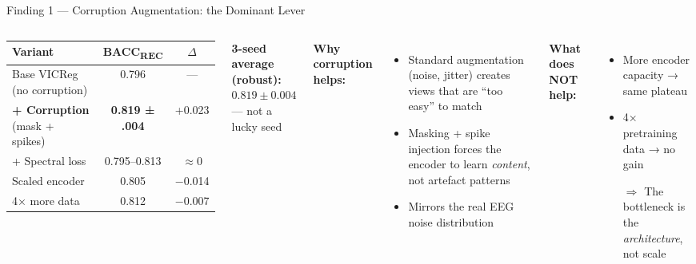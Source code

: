 \documentclass[aspectratio=169,10pt]{beamer}
\begin{document}
\begin{frame}{Finding 1 — Corruption Augmentation: the Dominant Lever}
\begin{columns}[T]
\begin{tabular}{lcc}
\toprule
Variant & BACC\textsubscript{REC} & $\Delta$ \\
\midrule
Base VICReg (no corruption) & 0.796 & — \\
\textbf{+ Corruption} (mask + spikes) & \textbf{0.819 ± .004} & \textcolor{good}{+0.023} \\
+ Spectral loss & 0.795--0.813 & $\approx$0 \\
Scaled encoder & 0.805 & $-$0.014 \\
4× more data & 0.812 & $-$0.007 \\
\bottomrule
\end{tabular}

\vspace{0.7em}
\textbf{3-seed average (robust):}\\
$0.819 \pm 0.004$ — not a lucky seed

\textbf{Why corruption helps:}
\begin{itemize}
  \item Standard augmentation (noise, jitter) creates views that are ``too easy'' to match
  \item Masking + spike injection forces the encoder to learn \emph{content}, not artefact patterns
  \item Mirrors the real EEG noise distribution
\end{itemize}

\vspace{0.5em}
\textbf{What does NOT help:}
\begin{itemize}
  \item More encoder capacity → same plateau
  \item 4× pretraining data → no gain
  \item[$\Rightarrow$] The bottleneck is the \emph{architecture}, not scale
\end{itemize}
\end{columns}
\end{frame}
\end{document}
